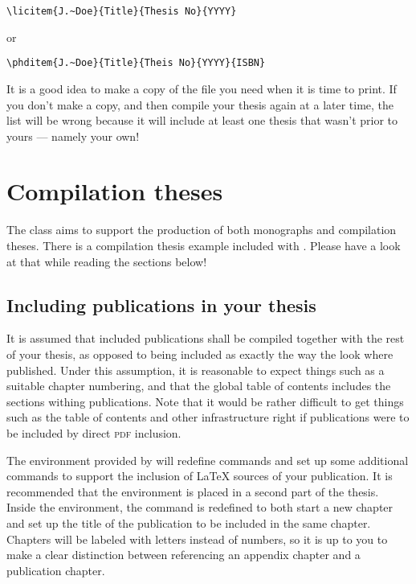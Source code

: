 {\verbatimsize
\begin{verbatim}
\licitem{J.~Doe}{Title}{Thesis No}{YYYY}
\end{verbatim}}

or

{\verbatimsize
\begin{verbatim}
\phditem{J.~Doe}{Title}{Theis No}{YYYY}{ISBN}
\end{verbatim}}

It is a good idea to make a copy of the file you need when it is time to print.  If you don't make a copy, and then compile your thesis again at a later time, the list will be wrong because it will include at least one thesis that wasn't prior to yours — namely your own!


\section{Compilation theses}
%
The \rtthesis class aims to support the production of both monographs and compilation theses.  There is a compilation thesis example included with \rtthesis.  Please have a look at that while reading the sections below!


\subsection{Including publications in your thesis}
%
It is assumed that included publications shall be compiled together with the rest of your thesis, as opposed to being included as exactly the way the look where published.  Under this assumption, it is reasonable to expect things such as a suitable chapter numbering, and that the global table of contents includes the sections withing publications.  Note that it would be rather difficult to get things such as the table of contents and other infrastructure right if publications were to be included by direct \textsc{pdf} inclusion.

The  environment provided by \rtthesis will redefine commands and set up some additional commands to support the inclusion of \LaTeX{} sources of your publication.  It is recommended that the environment is placed in a second part of the thesis.  Inside the environment, the  command is redefined to both start a new chapter and set up the title of the publication to be included in the same chapter.  Chapters will be labeled with letters instead of numbers, so it is up to you to make a clear distinction between referencing an appendix chapter and a publication chapter.

